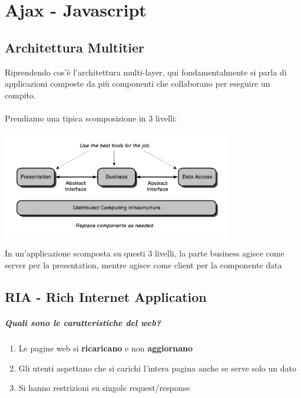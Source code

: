 \documentclass[12pt, a4paper, openany, twoside]{book}
\begin{document}
\chapter{Ajax - Javascript}
\section{Architettura Multitier}
Riprendendo cos'è l'architettura multi-layer, qui fondamentalmente si parla di
applicazioni composte da più componenti che collaborano per eseguire un compito.\\ \\
Prendiamo una tipica scomposizione in 3 livelli:
\begin{center}
\includegraphics[width=0.75\textwidth]{23}
\end{center}
In un'applicazione scomposta su questi 3 livelli, la parte business agisce come 
server per la presentation, mentre agisce come client per la componente data
\section{RIA - Rich Internet Application}
\paragraph{Quali sono le caratteristiche del web?}
\begin{enumerate}
	\item Le pagine web si \textbf{ricaricano} e non \textbf{aggiornano}
	\item Gli utenti aspettano che si carichi l'intera pagina anche se serve
	solo un dato
	\item Si hanno restrizioni su singole request/response
\end{enumerate}
\end{document}
